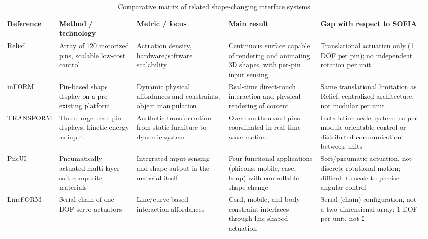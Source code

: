 \documentclass[lettersize,journal]{IEEEtran}
\begin{document}
	
	\begin{table}[!t]
		\centering
		\caption{Comparative matrix of related shape-changing interface systems}
		\label{tab:related_work_matrix}
		\scriptsize
		
		\setlength{\tabcolsep}{3pt}
		\renewcommand{\arraystretch}{1.1}
		
		\begin{tabularx}{\textwidth}
			{@{}P{2.2cm} P{3cm} P{3cm} P{4cm} Y@{}}
			
			\toprule
			Reference & Method / technology & Metric / focus & Main result & Gap with respect to SOFIA \\
			\midrule
			
			Relief \cite{leithinger2010relief} &
			Array of 120 motorized pins, scalable low-cost control &
			Actuation density, hardware/software scalability &
			Continuous surface capable of rendering and animating 3D shapes, with per-pin input sensing &
			Translational actuation only (1 DOF per pin); no independent rotation per unit \\
			
			inFORM \cite{follmer2013inform} &
			Pin-based shape display on a pre-existing platform &
			Dynamic physical affordances and constraints, object manipulation &
			Real-time direct-touch interaction and physical rendering of content &
			Same translational limitation as Relief; centralized architecture, not modular per unit \\
			
			TRANSFORM \cite{ishii2015transform} &
			Three large-scale pin displays, kinetic energy as input &
			Aesthetic transformation from static furniture to dynamic system &
			Over one thousand pins coordinated in real-time wave motion &
			Installation-scale system; no per-module orientable control or distributed communication between units \\
			
			PneUI \cite{yao2013pneui} &
			Pneumatically actuated multi-layer soft composite materials &
			Integrated input sensing and shape output in the material itself &
			Four functional applications (phicons, mobile, case, lamp) with controllable shape change &
			Soft/pneumatic actuation, not discrete rotational motion; difficult to scale to precise angular control \\
			
			LineFORM \cite{nakagaki2015lineform} &
			Serial chain of one-DOF servo actuators &
			Line/curve-based interaction affordances &
			Cord, mobile, and body-constraint interfaces through line-shaped actuation &
			Serial (chain) configuration, not a two-dimensional array; 1 DOF per unit, not 2 \\
			

\end{tabularx}
\end{table}
\end{document}
